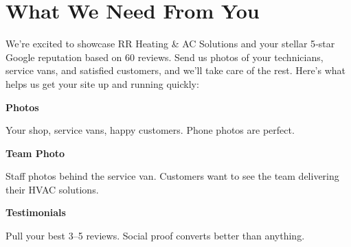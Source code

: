 \documentclass[11pt,letterpaper]{article}
\begin{document}
\vspace{0.2em}

\section*{What We Need From You}

We’re excited to showcase RR Heating \& AC Solutions and your stellar 5‑star Google reputation based on 60 reviews. Send us photos of your technicians, service vans, and satisfied customers, and we’ll take care of the rest. Here’s what helps us get your site up and running quickly:

\vspace{0.12em}

\noindent\begin{minipage}[t]{0.48\textwidth}
\begin{tcolorbox}[colframe=accent-teal, boxrule=1pt, left=0.7em, right=0.7em, top=0.5em, bottom=0.5em, arc=4pt, boxsep=0pt]
{\bfseries\small\color{accent-teal}Photos}

\vspace{0.15em}

{\small Your shop, service vans, happy customers. Phone photos are perfect.}
\end{tcolorbox}

\vspace{0.1em}

\begin{tcolorbox}[colframe=accent-teal, boxrule=1pt, left=0.7em, right=0.7em, top=0.5em, bottom=0.5em, arc=4pt, boxsep=0pt]
{\bfseries\small\color{accent-teal}Team Photo}

\vspace{0.15em}

{\small Staff photos behind the service van. Customers want to see the team delivering their HVAC solutions.}
\end{tcolorbox}

\vspace{0.1em}

\begin{tcolorbox}[colframe=accent-teal, boxrule=1pt, left=0.7em, right=0.7em, top=0.5em, bottom=0.5em, arc=4pt, boxsep=0pt]
{\bfseries\small\color{accent-teal}Testimonials}

\vspace{0.15em}

{\small Pull your best 3–5 reviews. Social proof converts better than anything.}
\end{tcolorbox}
\end{minipage}
\end{document}
